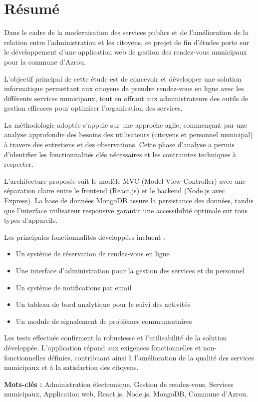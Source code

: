 \chapter*{Résumé}

Dans le cadre de la modernisation des services publics et de l'amélioration de la relation entre l'administration et les citoyens, ce projet de fin d'études porte sur le développement d'une application web de gestion des rendez-vous municipaux pour la commune d'Azrou.

L'objectif principal de cette étude est de concevoir et développer une solution informatique permettant aux citoyens de prendre rendez-vous en ligne avec les différents services municipaux, tout en offrant aux administrateurs des outils de gestion efficaces pour optimiser l'organisation des services.

La méthodologie adoptée s'appuie sur une approche agile, commençant par une analyse approfondie des besoins des utilisateurs (citoyens et personnel municipal) à travers des entretiens et des observations. Cette phase d'analyse a permis d'identifier les fonctionnalités clés nécessaires et les contraintes techniques à respecter.

L'architecture proposée suit le modèle MVC (Model-View-Controller) avec une séparation claire entre le frontend (React.js) et le backend (Node.js avec Express). La base de données MongoDB assure la persistance des données, tandis que l'interface utilisateur responsive garantit une accessibilité optimale sur tous types d'appareils.

Les principales fonctionnalités développées incluent :
\begin{itemize}
    \item Un système de réservation de rendez-vous en ligne
    \item Une interface d'administration pour la gestion des services et du personnel
    \item Un système de notifications par email
    \item Un tableau de bord analytique pour le suivi des activités
    \item Un module de signalement de problèmes communautaires
\end{itemize}

Les tests effectués confirment la robustesse et l'utilisabilité de la solution développée. L'application répond aux exigences fonctionnelles et non-fonctionnelles définies, contribuant ainsi à l'amélioration de la qualité des services municipaux et à la satisfaction des citoyens.

\textbf{Mots-clés :} Administration électronique, Gestion de rendez-vous, Services municipaux, Application web, React.js, Node.js, MongoDB, Commune d'Azrou.
